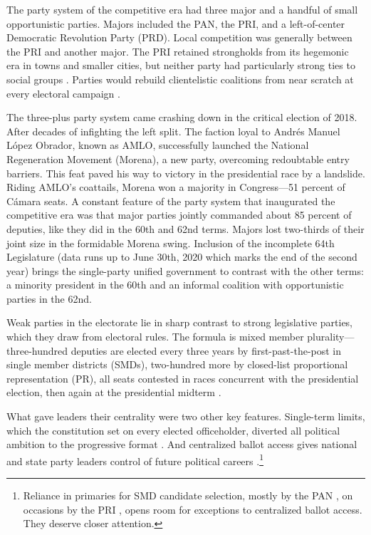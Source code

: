 \documentclass[letter,12pt]{article}
\begin{document}
The party system of the competitive era had three major and a handful of small opportunistic parties. Majors included the PAN, the PRI, and a left-of-center Democratic Revolution Party (PRD). Local competition was generally between the PRI and another major. The PRI retained strongholds from its hegemonic era in towns and smaller cities, but neither party had particularly strong ties to social groups \citep{moreno.decisElec.2009}. Parties would rebuild clientelistic coalitions from near scratch at every electoral campaign \citep{diaz-estevez-magaloni-Poverty-book.2016}.

The three-plus party system came crashing down in the critical election of 2018. After decades of infighting the left split. The faction loyal to Andrés Manuel López Obrador, known as AMLO, successfully launched the National Regeneration Movement (Morena), a new party, overcoming redoubtable entry barriers. This feat paved his way to victory in the presidential race by a landslide. Riding AMLO's coattails, Morena won a majority in Congress---51 percent of Cámara seats. A constant feature of the party system that inaugurated the competitive era was that major parties jointly commanded about 85 percent of deputies, like they did in the 60th and 62nd terms. Majors lost two-thirds of their joint size in the formidable Morena swing. Inclusion of the incomplete 64th Legislature (data runs up to June 30th, 2020 which marks the end of the second year) brings the single-party unified government to contrast with the other terms: a minority president in the 60th and an informal coalition with opportunistic parties in the 62nd.


Weak parties in the electorate lie in sharp contrast to strong legislative parties, which they draw from electoral rules. The formula is mixed member plurality---three-hundred deputies are elected every three years by first-past-the-post in single member districts (SMDs), two-hundred more by closed-list proportional representation (PR), all seats contested in races concurrent with the presidential election, then again at the presidential midterm \citep{weldonMixedMemberSys2001}.

What gave leaders their centrality were two other key features. Single-term limits, which the constitution set on every elected officeholder, diverted all political ambition to the progressive format \citep{schlesinger.1966}. And centralized ballot access gives national and state party leaders control of future political careers \citep{langston.2008}.\footnote{Reliance in primaries for SMD candidate selection, mostly by the PAN \citep{ascencio.kerevel.cand-sel-beh.2021}, on occasions by the PRI \citep{poire.phd.2002}, opens room for exceptions to centralized ballot access. They deserve closer attention.}
\end{document}
